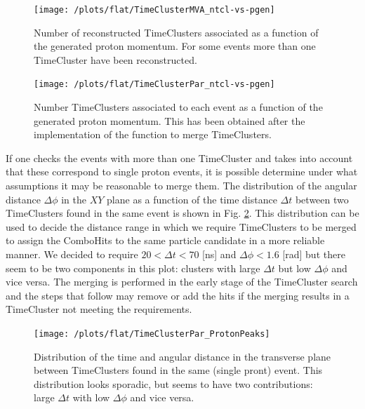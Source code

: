 \documentclass[12pt,a4paper,openright, oneside, titlepage]{book} %
\begin{document}
\begin{figure}[!htb]
    \centering
    \begin{minipage}{.49\textwidth}
		\centering
		\texttt{[image: /plots/flat/TimeClusterMVA\_ntcl-vs-pgen]}
		\caption[Number of TimeClusters per generated proton momentum]{Number of reconstructed TimeClusters associated 
		as a function of the generated proton momentum. 
		For some events more than one TimeCluster have been reconstructed.}
		\label{_TimeClusterMVA_ntcl-vs-pgen}
	\end{minipage}
	\hfill
    \begin{minipage}{0.49\textwidth}
    	\centering
    	\texttt{[image: /plots/flat/TimeClusterPar\_ntcl-vs-pgen]}
		\caption[Number of TimeClusters per generated momentum after merging]{Number TimeClusters associated to each event as a function of the generated proton momentum. 
		This has been obtained after the implementation of the function to merge TimeClusters.}
		\label{_TimeClusterPar_ntcl-vs-pgen}
	\end{minipage}
\end{figure}

\noindent If one checks the events with more than one TimeCluster and takes into account that these correspond to single proton events, it is possible determine under what assumptions it may be reasonable to merge them. 
The distribution of the angular distance $\Delta \phi$ in the $XY$ plane as a function of the time distance $\Delta t$ between two TimeClusters found in the same event is shown in Fig. \ref{_TimeClusterPar_ProtonPeaks}. 
This distribution can be used to decide the distance range in which we require TimeClusters to be merged to assign the ComboHits to the same particle candidate in a more reliable manner. 
We decided to require $20<\Delta t<70$ [ns] and $\Delta \phi < 1.6$ [rad] but there seem to be two components in this plot: clusters with large $\Delta t$ but low $\Delta \phi$ and vice versa.
The merging is performed in the early stage of the TimeCluster search and the steps that follow may remove or add the hits if the merging results in a TimeCluster not meeting the requirements.

\begin{figure}[!htb]
\centering
\texttt{[image: /plots/flat/TimeClusterPar\_ProtonPeaks]}
\caption[TimeClusters distance in single particle event]{Distribution of the time and angular distance in the transverse plane 
between TimeClusters found in the same (single pront) event. 
This distribution looks sporadic, 
but seems to have two contributions: 
large $\Delta t$ with low $\Delta \phi$ and vice versa.}
\label{_TimeClusterPar_ProtonPeaks}
\end{figure}
\end{document}
